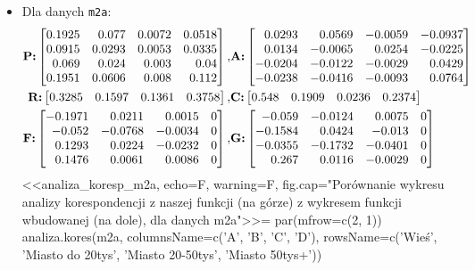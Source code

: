 \documentclass[12pt]{mwart}
\begin{document}
\begin{itemize}[label=$\bullet$]
	@
  \item Dla danych \verb|m2a|:
  \begin{align}
		\text{\textbf{P:}}
		\begin{bmatrix*}[r]
			0.1925 & 0.077 & 0.0072 & 0.0518 \\
			0.0915 & 0.0293 & 0.0053 & 0.0335 \\
			0.069 & 0.024 & 0.003 & 0.04 \\
			0.1951 & 0.0606 & 0.008 & 0.112
		\end{bmatrix*}, & 
  	\text{\textbf{A:}}
  	\begin{bmatrix*}[r]
		0.0293 &  0.0569 & -0.0059 & -0.0937 \\
		0.0134 & -0.0065 &  0.0254 & -0.0225 \\
		-0.0204 & -0.0122 & -0.0029 &  0.0429 \\
		-0.0238 & -0.0416 & -0.0093 &  0.0764
	\end{bmatrix*} \\
  	\text{\textbf{R:}}
  	\begin{bmatrix*}[r]
    0.3285& 0.1597& 0.1361& 0.3758
    \end{bmatrix*}, & 
		\text{\textbf{C:}}
		\begin{bmatrix*}[r]
    0.548 & 0.1909 & 0.0236 & 0.2374
    \end{bmatrix*} \\
		\text{\textbf{F:}}
		\begin{bmatrix*}[r]
			-0.1971 &  0.0211 &  0.0015 & 0 \\
			-0.052& -0.0768 & -0.0034 & 0 \\
			0.1293 &  0.0224 & -0.0232 & 0 \\
			0.1476 &  0.0061 &  0.0086 & 0
		\end{bmatrix*}, &
		\text{\textbf{G:}}
		\begin{bmatrix*}[r]
			-0.059 & -0.0124 &  0.0075 & 0 \\
			-0.1584 & 0.0424 & -0.013 & 0 \\
			-0.0355 & -0.1732 & -0.0401 & 0 \\
			0.267 &  0.0116 & -0.0029 & 0
                \end{bmatrix*}
    \end{align}
    <<analiza_koresp_m2a, echo=F, warning=F, fig.cap="Porównanie wykresu analizy korespondencji z naszej funkcji (na górze) z wykresem funkcji wbudowanej (na dole), dla danych m2a">>=
    par(mfrow=c(2, 1))
  	  analiza.kores(m2a, columnsName=c('A', 'B', 'C', 'D'), 
  	                rowsName=c('Wieś', 'Miasto do 20tys', 'Miasto 20-50tys', 'Miasto 50tys+'))

\end{itemize}
\end{document}
